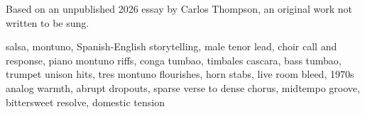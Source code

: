 

\begin{notes}
Based on an unpublished 2026 essay by Carlos Thompson, an original work not written to be sung.
\end{notes}

\begin{style}
salsa, montuno, Spanish-English storytelling, male tenor lead, choir call and response, piano montuno riffs, conga tumbao, timbales cascara, bass tumbao, trumpet unison hits, tres montuno flourishes, horn stabs, live room bleed, 1970s analog warmth, abrupt dropouts, sparse verse to dense chorus, midtempo groove, bittersweet resolve, domestic tension
\end{style}

